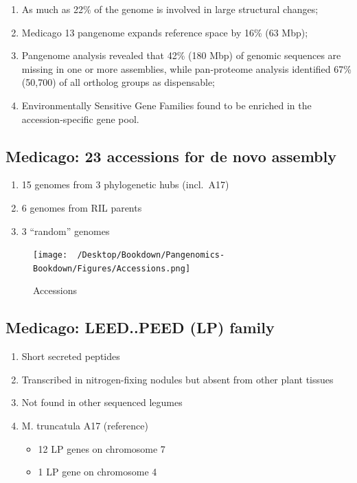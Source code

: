 \documentclass[
]{book}
\providecommand{\tightlist}{%
  \setlength{\itemsep}{0pt}\setlength{\parskip}{0pt}}
\begin{document}
\begin{enumerate}
\def\labelenumi{\arabic{enumi}.}
\tightlist
\item
  As much as 22\% of the genome is involved in large structural changes;
\item
  Medicago 13 pangenome expands reference space by 16\% (63 Mbp);
\item
  Pangenome analysis revealed that 42\% (180 Mbp) of genomic sequences are missing in one or more assemblies, while pan-proteome analysis identified 67\% (50,700) of all ortholog groups as dispensable;
\item
  Environmentally Sensitive Gene Families found to be enriched in the accession-specific gene pool.
\end{enumerate}

\hypertarget{medicago-23-accessions-for-de-novo-assembly}{%
\subsection{Medicago: 23 accessions for de novo assembly}\label{medicago-23-accessions-for-de-novo-assembly}}

\begin{enumerate}
\def\labelenumi{\arabic{enumi}.}
\tightlist
\item
  15 genomes from 3 phylogenetic hubs (incl.~A17)
\item
  6 genomes from RIL parents
\item
  3 ``random'' genomes
\end{enumerate}

\begin{figure}
\centering
\texttt{[image: ~/Desktop/Bookdown/Pangenomics-Bookdown/Figures/Accessions.png]}
\caption{Accessions}
\end{figure}

\hypertarget{medicago-leed..peed-lp-family}{%
\subsection{Medicago: LEED..PEED (LP) family}\label{medicago-leed..peed-lp-family}}

\begin{enumerate}
\def\labelenumi{\arabic{enumi}.}
\tightlist
\item
  Short secreted peptides
\item
  Transcribed in nitrogen-fixing nodules but absent from other plant tissues
\item
  Not found in other sequenced legumes
\item
  M. truncatula A17 (reference)

  \begin{itemize}
  \tightlist
  \item
    12 LP genes on chromosome 7
  \item
    1 LP gene on chromosome 4
  \end{itemize}
\end{enumerate}
\end{document}
